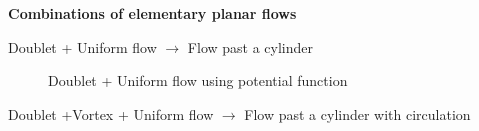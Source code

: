 
{\bf Combinations of elementary planar flows}

Doublet + Uniform flow $\rightarrow$ Flow past a cylinder

\begin{figure}[h]
\begin{center}
\end{center}
\caption{Doublet + Uniform flow using potential function}
\label{planardoubletuniformflow}
\end{figure}


Doublet +Vortex + Uniform flow $\rightarrow$ Flow past a cylinder with circulation

